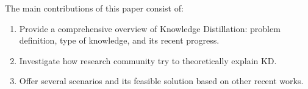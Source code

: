 The main contributions of this paper consist of:
\begin{enumerate}
   \item Provide a comprehensive overview of Knowledge Distillation: problem definition, type of knowledge, and its recent progress.
   \item Investigate how research community try to theoretically explain KD.
   \item Offer several scenarios and its feasible solution based on other recent works.
\end{enumerate}
